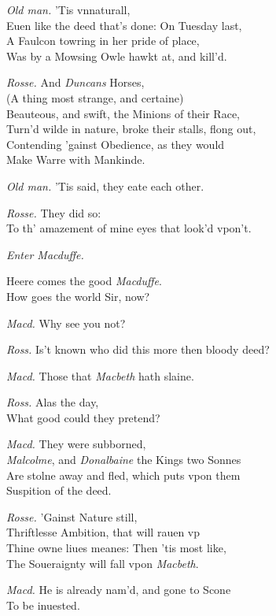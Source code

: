 \documentclass[12pt]{sides}
\newcommand{\clStageDir}[1]{\hspace*{\fill}\textit{#1}\hspace*{\fill}}
\newcommand{\dia}[1]{\hskip 15pt\textit{#1}\hskip 6pt}
\begin{document}
\begin{multicols}{2}
            \dia{Old man.} 'Tis vnnaturall, \\ Euen like the deed that's done: On Tuesday last, \\ A Faulcon towring in her pride of place, \\ Was by a Mowsing Owle hawkt at, and kill'd.

            \dia{Rosse.} And \textit{Duncans} Horses, \\ (A thing most strange, and certaine) \\ Beauteous, and swift, the Minions of their Race, \\ Turn'd wilde in nature, broke their stalls, flong out, \\ Contending 'gainst Obedience, as they would \\ Make Warre with Mankinde.

            \dia{Old man.} 'Tis said, they eate each other.

            \dia{Rosse.} They did so: \\ To th' amazement of mine eyes that look'd vpon't.

            \clStageDir{Enter Macduffe.}

            Heere comes the good \textit{Macduffe}. \\ How goes the world Sir, now?

            \dia{Macd.} Why see you not?

            \dia{Ross.} Is't known who did this more then bloody deed?

            \dia{Macd.} Those that \textit{Macbeth} hath slaine.

            \dia{Ross.} Alas the day, \\ What good could they pretend?

            \dia{Macd.} They were subborned, \\ \textit{Malcolme}, and \textit{Donalbaine} the Kings two Sonnes \\ Are stolne away and fled, which puts vpon them \\ Suspition of the deed.

            \dia{Rosse.} 'Gainst Nature still, \\ Thriftlesse Ambition, that will rauen vp \\ Thine owne liues meanes: Then 'tis most like, \\ The Soueraignty will fall vpon \textit{Macbeth}.

            \dia{Macd.} He is already nam'd, and gone to Scone \\ To be inuested.


\end{multicols}
\end{document}
